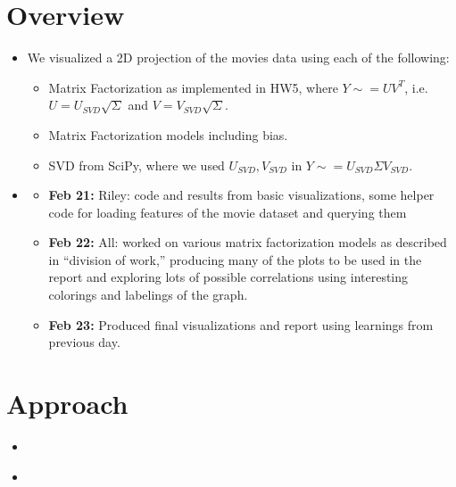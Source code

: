 \section{Overview}
\medskip
\begin{itemize}

    \item {}

        We visualized a 2D projection of the movies data using each of the following:
        \begin{itemize}
            \item Matrix Factorization as implemented in HW5, where $Y \sim = UV^T$, i.e. $U = U_{SVD}\sqrt{\Sigma}$ and $V = V_{SVD}\sqrt{\Sigma}$.
            \item Matrix Factorization models including bias. %
            \item SVD from SciPy, where we used $U_{SVD},V_{SVD}$ in $Y \sim = U_{SVD} \Sigma V_{SVD}$.
        \end{itemize}

    \item {}
    \begin{itemize}
    \item \textbf{Feb 21:} Riley: code and results from basic visualizations, some helper code for loading features of the movie dataset and querying them
    \item \textbf{Feb 22:} All: worked on various matrix factorization models as described in ``division of work,'' producing many of the plots to be used in the report and exploring lots of possible correlations using interesting colorings and labelings of the graph.
    \item \textbf{Feb 23:} Produced final visualizations and report using learnings from previous day.
    \end{itemize}

\end{itemize}



\section{Approach}
\medskip
\begin{itemize}

    \item {}

    \item {} \\




\end{itemize}

